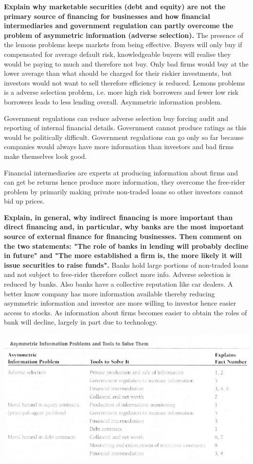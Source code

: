 \documentclass[12pt]{examnotes}
\begin{document}
\textbf{Explain why marketable securities (debt and equity) are not the primary source of financing for businesses and how financial intermediaries and government regulation can partly overcome the problem of asymmetric information (adverse selection).}
The presence of the lemons problems keeps markets from being effective. Buyers will only buy if compensated for average default risk, knowledgeable buyers will realise they would be paying to much and therefore not buy. Only bad firms would buy at the lower average than what should be charged for their riskier investments, but investors would not want to sell therefore efficiency is reduced.
Lemons problems is a adverse selection problem, i.e. more high risk borrowers and fewer low risk borrowers leads to less lending overall. Asymmetric information problem.

Government regulations can reduce adverse selection buy forcing audit and reporting of internal financial details. Government cannot produce ratings as this would be politically difficult. Government regulations can go only so far because companies would always have more information than investors and bad firms make themselves look good.

Financial intermediaries are experts at producing information about firms and can get be returns hence produce more information, they overcome the free-rider problem by primarily making private non-traded loans so other investors cannot bid up prices.

\textbf{Explain, in general, why indirect financing is more important than direct financing and, in particular, why banks are the most important source of external finance for financing businesses. Then comment on the two statements: "The role of banks in lending will probably decline in future" and "The more established a firm is, the more likely it will issue securities to raise funds".}
Banks hold large portions of non-traded loans and not subject to free-rider therefore collect more info. Adverse selection is reduced by banks. Also banks have a collective reputation like car dealers. 
A better know company has more information available thereby reducing asymmetric information and investor are more willing to investor hence easier access to stocks.
As information about firms becomes easier to obtain the roles of bank will decline, largely in part due to technology.

\includegraphics[scale=0.5]{./imgs/81.jpg}
\end{document}
